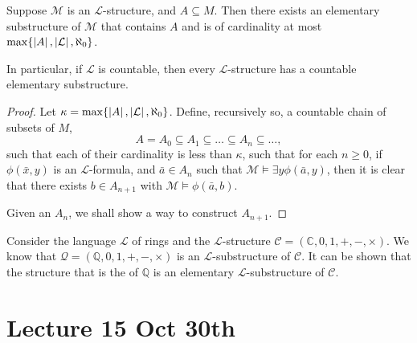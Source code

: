 \documentclass[notoc,notitlepage]{tufte-book}
\begin{document}
\begin{thm}\label{thm:downward_lowenheim_skolem}
  Suppose $\mathcal{M}$ is an $\mathcal{L}$-structure, and $A \subseteq M$. Then there exists an elementary substructure of $\mathcal{M}$ that contains $A$ and is of cardinality at most $\max\{ \left|A\right|, \left|\mathcal{L}\right|, \aleph_0 \}$.

  In particular, if $\mathcal{L}$ is countable, then every $\mathcal{L}$-structure has a countable elementary substructure.
\end{thm}

\begin{proof}
  Let $\kappa = \max \{ \left| A \right|, \left| \mathcal{L} \right|, \aleph_0 \}$. Define, recursively so, a countable chain of subsets of $M$,
  \begin{equation*}
    A = A_0 \subseteq A_1 \subseteq \hdots \subseteq A_n \subseteq \hdots,
  \end{equation*}
  such that each of their cardinality is less than $\kappa$, such that for each $n \geq 0$, if $\phi(\bar{x}, y)$ is an $\mathcal{L}$-formula, and $\bar{a} \in A_n$ such that $\mathcal{M} \models \exists y \phi(\bar{a}, y)$, then it is clear that there exists $b \in A_{n + 1}$ with $\mathcal{M} \models \phi(\bar{a}, b)$.

  Given an $A_n$, we shall show a way to construct $A_{n + 1}$.  
\end{proof}

\begin{eg}
  Consider the language $\mathcal{L}$ of rings and the $\mathcal{L}$-structure $\mathcal{C} = (\mathbb{C}, 0, 1, +, -, \times)$. We know that $\mathcal{Q} = (\mathbb{Q}, 0, 1, +, -, \times)$ is an $\mathcal{L}$-substructure of $\mathcal{C}$. It can be shown that the structure that is the  of $\mathbb{Q}$ is an elementary $\mathcal{L}$-substructure of $\mathcal{C}$.
\end{eg}




\chapter{Lecture 15 Oct 30th}%
\label{chp:lecture_15_oct_30th}
\end{document}
